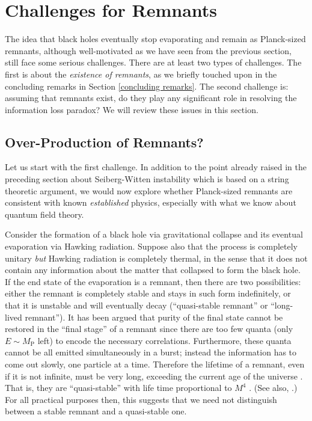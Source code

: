 \documentclass[12pt]{article}
\newcommand{\2}{$^2$}
\newcommand{\3}{$^3$}
\newcommand{\4}{$_4$}
\newcommand{\5}{$_5$}
\begin{document}
\section{Challenges for Remnants}\label{challenges}

The idea that black holes eventually stop evaporating and remain as Planck-sized remnants, although well-motivated as we have seen from the previous section, still face some serious challenges. There are at least two types of challenges. The first is about the \emph{existence of remnants}, as we briefly touched upon in the concluding remarks in Section \ref{concluding remarks}. The second challenge is: assuming that remnants exist, do they play any significant role in resolving the information loss paradox? We will review these issues in this section. 

\subsection{Over-Production of Remnants?}\label{overproduce}


Let us start with the first challenge. In addition to the point already raised in the preceding section about Seiberg-Witten instability which is based on a string theoretic argument, we would now explore whether Planck-sized remnants are consistent with known \emph{established} physics, especially with what we know about quantum field theory.

Consider the formation of a black hole via gravitational collapse and its eventual evaporation via Hawking radiation. Suppose also that the process is completely unitary \emph{but} Hawking radiation is completely thermal, in the sense that it does not contain any information about the matter that collapsed to form the black hole. If the end state of the evaporation is a remnant, then there are two possibilities: either the remnant is completely stable and stays in such form indefinitely, or that it is unstable and will eventually decay (``quasi-stable remnant'' or ``long-lived remnant''). It has been argued that purity of the final state cannot be restored in the ``final stage'' of a remnant since there are too few quanta (only $E \sim M_\text{P}$ left) to encode the necessary correlations. Furthermore,
these quanta cannot be all emitted simultaneously in a burst; instead the information has to come out slowly, one particle at a time.
Therefore the lifetime of a remnant, even if it is not infinite, must be very long, exceeding the current age of the universe \cite{ACN}. That is, they are ``quasi-stable'' with life time proportional to $M^4$ \cite{preskill}. (See also, \cite{Giddings1, CW}.) For all practical purposes then, this suggests that we need not distinguish between a stable remnant and a quasi-stable one. 
\end{document}
